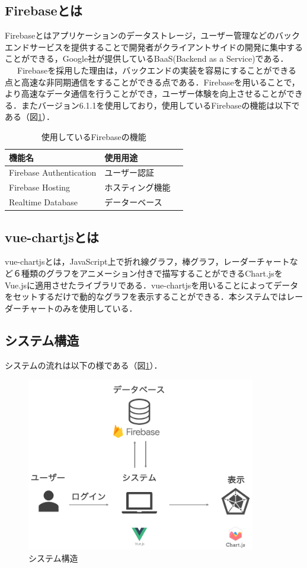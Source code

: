 \documentclass{funthesis}
\begin{document}
\subsection{Firebaseとは}
Firebaseとはアプリケーションのデータストレージ，ユーザー管理などのバックエンドサービスを提供することで開発者がクライアントサイドの開発に集中することができる，Google社が提供しているBaaS(Backend as a Service)である．\\
\ \ \ Firebaseを採用した理由は，バックエンドの実装を容易にすることができる点と高速な非同期通信をすることができる点である．Firebaseを用いることで，より高速なデータ通信を行うことができ，ユーザー体験を向上させることができる．またバージョン6.1.1を使用しており，使用しているFirebaseの機能は以下である（図\ref{Firebase}）．

\begin{table}[H]
\begin{center}

  \caption{使用しているFirebaseの機能}
  \begin{tabular}{lll} \hline
  機能名&使用用途\tabularnewline \hline
    Firebase Authentication& ユーザー認証  \tabularnewline
    Firebase Hosting&ホスティング機能\tabularnewline
    Realtime Database &データーベース \tabularnewline
    \hline
  \end{tabular}
  \label{Firebase}
  \end{center}
\end{table}


\subsection{vue-chartjsとは}
vue-chartjsとは，JavaScript上で折れ線グラフ，棒グラフ，レーダーチャートなど６種類のグラフをアニメーション付きで描写することができるChart.jsをVue.jsに適用させたライブラリである．vue-chartjsを用いることによってデータをセットするだけで動的なグラフを表示することができる．本システムではレーダーチャートのみを使用している．


\subsection{システム構造}
システムの流れは以下の様である（図\ref{sysytem}）．\\
\begin{figure}[H]
 \centering
   \includegraphics[width=100mm]{figures/sysytemstrucuture.png}
 \caption{システム構造}
 \label{sysytem}
\end{figure}
\end{document}
